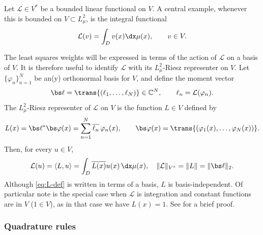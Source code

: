 \documentclass[10pt,dvipsnames]{amsart}
\begin{document}
Let \(\mathcal L\in V^*\) be a bounded linear functional on \(V\).  A
central example, whenever this is bounded on $V \subset L^2_\mu$, is the integral functional
\[
    \mathcal L(v)
    =
    \int_D v(x)\dx\mu(x),
    \qquad v\in V.
\]

The least squares weights will be expressed in terms of the action of
\(\mathcal L\) on a basis of \(V\).  It is therefore useful to identify
\(\mathcal L\) with its \(L^2_\mu\)-Riesz representer on \(V\).  Let
\(\{\varphi_n\}_{n=1}^N\) be an(y) orthonormal basis for \(V\), and define the
moment vector
\begin{equation}
\label{eq:moment-vector}
    \bs\ell
    =
    \trans{(\ell_1,\ldots,\ell_N)}\in\mathbb C^N,
    \qquad
    \ell_n=\mathcal L(\varphi_n).
\end{equation}
The \(L^2_\mu\)-Riesz representer of \(\mathcal L\) on \(V\) is the function
\(L\in V\) defined by
\begin{equation}
\label{eq:L-def}
    L(x)
    =
    \bs\ell^*\bs\varphi(x)
    =
    \sum_{n=1}^N \overline{\ell_n}\,\varphi_n(x),
    \qquad
    \bs\varphi(x)
    =
    \trans{(\varphi_1(x),\ldots,\varphi_N(x))}.
\end{equation}
Then, for every \(u\in V\),
\begin{equation}
\label{eq:L-integral}
    \mathcal L(u)
    =
    \langle L,u\rangle
    =
    \int_D \overline{L(x)}u(x)\,\dx \mu(x), \hskip 10pt
    \|\mathcal L\|_{V^*}=\|L\|=\|\bs\ell\|_2.
\end{equation}
Although \eqref{eq:L-def} is written in terms of a basis, \(L\) is
basis-independent. Of particular note is the special case when $\mathcal{L}$ is
integration and constant functions are in $V$ ($1 \in V$), as in that case we
have $L(x) = 1$. See  for a brief proof.


\subsubsection{Quadrature rules}
\label{sssec:preliminaries-quadrature}
\end{document}
